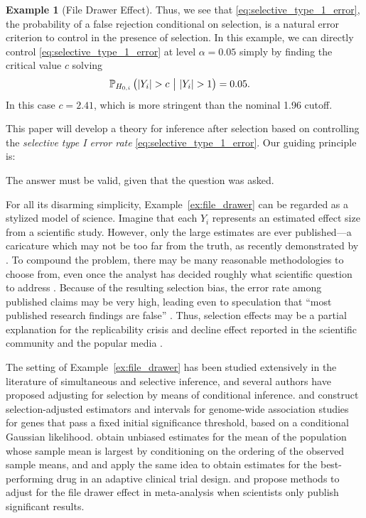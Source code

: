 \documentclass{article}
\theoremstyle{definition}
\newtheorem{example}{Example}
\begin{document}
\begin{example}[File Drawer Effect]
Thus, we see that \eqref{eq:selective_type_1_error}, the probability of a false rejection conditional on selection, is a natural error criterion to control in the presence of selection. In this example, we can directly control \eqref{eq:selective_type_1_error} at level $\alpha=0.05$ simply by finding the critical value $c$ solving
\begin{align*}
\P_{H_{0,i}}\left( |Y_i| > c\ \big|\ |Y_i| > 1 \right) &= 0.05.
\end{align*}
In this case $c = 2.41$, which is more stringent than the nominal 1.96 cutoff.
\end{example}

This paper will develop a theory for inference after selection based on controlling the {\em selective type I error rate} \eqref{eq:selective_type_1_error}. Our guiding principle is:
\begin{center}
The answer must be valid, given that the question was asked.
\end{center}

For all its disarming simplicity, Example~\ref{ex:file_drawer} can be regarded as a stylized model of science. Imagine that each $Y_i$ represents an estimated effect size from a scientific study. However, only the large estimates are ever published---a caricature which may not be too far from the truth, as recently demonstrated by \citet{franco14}. To compound the problem, there may be many reasonable methodologies to choose from, even once the analyst has decided roughly what scientific question to address \citep{gelman2013garden}. Because of the resulting selection bias, the error rate among published claims may be very high, leading even to speculation that ``most published research findings are false'' \citep{ioannidis2005most}. Thus, selection effects may be a partial explanation for the replicability crisis and decline effect reported in the scientific community \citep{yong2012replication} and the popular media \citep{johnson2014new}.

The setting of Example~\ref{ex:file_drawer} has been studied extensively in the literature of simultaneous and selective inference, and several authors have proposed adjusting for selection by means of conditional inference. \citet{zollner2007overcoming} and \citet{zhong2008bias} construct selection-adjusted estimators and intervals for genome-wide association studies for genes that pass a fixed initial significance threshold, based on a conditional Gaussian likelihood.  \citet{cohen1989two} obtain unbiased estimates for the mean of the population whose sample mean is largest by conditioning on the ordering of the observed sample means, and \citet{sampson2005drop} and \citet{sill2009drop} apply the same idea to obtain estimates for the best-performing drug in an adaptive clinical trial design. \citet{hedges1984estimation} and \citet{hedges1992modeling} propose methods to adjust for the file drawer effect in meta-analysis when scientists only publish significant results.
\end{document}
